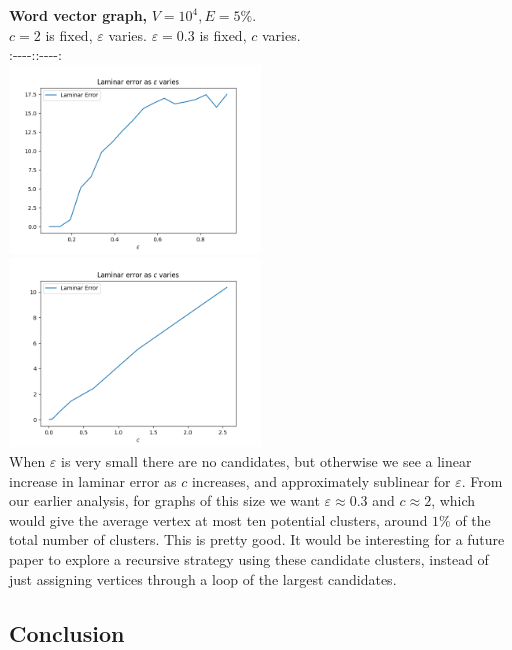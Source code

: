 \documentclass[
]{article}
\begin{document}
\textbf{Word vector graph,} {\(V = 10^{4},E = 5\%\)}.\\
{\(c = 2\)} is fixed, {\(\varepsilon\)} varies. \textbar{}
{\(\varepsilon = 0.3\)} is fixed, {\(c\)} varies.\\
:-\/-\/-\/-:\textbar:-\/-\/-\/-:\\
\includegraphics[width=0.5\textwidth]{images/laminar_error_as_epsilon_varies_word_vector.png}
\textbar{}
\includegraphics[width=0.5\textwidth]{images/laminar_error_as_c_varies_word_vector.png}\\
When {\(\varepsilon\)} is very small there are no candidates, but
otherwise we see a linear increase in laminar error as {\(c\)}
increases, and approximately sublinear for {\(\varepsilon\)}. From our
earlier analysis, for graphs of this size we want
  {\(\varepsilon \approx 0.3\)} and {\(c \approx 2\)}, which would give
the average vertex at most ten potential clusters, around {\(1\%\)} of
the total number of clusters. This is pretty good. It would be
interesting for a future paper to explore a recursive strategy using
these candidate clusters, instead of just assigning vertices through a
loop of the largest candidates.

\hypertarget{conclusion}{%
  \subsection{Conclusion}\label{conclusion}}
\end{document}
